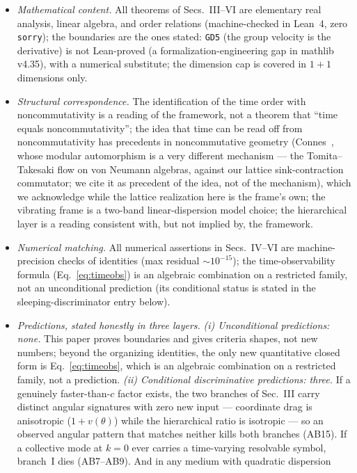 \documentclass[aps,prd,preprint,superscriptaddress,amsmath,amssymb]{revtex4-2}
\begin{document}
\begin{itemize}
\item \emph{Mathematical content.}  All theorems of Secs.~III--VI are
elementary real analysis, linear algebra, and order relations
(machine-checked in Lean~4, zero \texttt{sorry}); the boundaries are
the ones stated: \texttt{GD5} (the group velocity is the derivative)
is not Lean-proved (a formalization-engineering gap in mathlib
v4.35), with a numerical substitute; the dimension cap is covered in
$1+1$ dimensions only.
\item \emph{Structural correspondence.}  The identification of the
time order with noncommutativity is a reading of the framework, not a
theorem that ``time equals noncommutativity''; the idea that time
can be read off from noncommutativity has precedents in
noncommutative geometry (Connes~\cite{connes1994ncg}, whose modular
automorphism is a very different mechanism --- the Tomita--Takesaki
flow on von Neumann algebras, against our lattice sink-contraction
commutator; we cite it as precedent of the idea, not of the
mechanism), which we
acknowledge while the lattice realization here is the frame's own;
the vibrating frame is
a two-band linear-dispersion model choice; the hierarchical layer is
a reading consistent with, but not implied by, the framework.
\item \emph{Numerical matching.}  All numerical assertions in
Secs.~IV--VI are machine-precision checks of identities
(max residual $\sim 10^{-15}$); the time-observability formula
(Eq.~\ref{eq:timeobs}) is an algebraic combination on a restricted
family, not an unconditional prediction (its conditional status is
stated in the sleeping-discriminator entry below).
\item \emph{Predictions, stated honestly in three layers.}
\emph{(i) Unconditional predictions: none.}  This paper proves
boundaries and gives criteria shapes, not new numbers; beyond the
organizing identities, the only new quantitative closed form is
Eq.~\ref{eq:timeobs}, which is an
algebraic combination on a restricted family, not a prediction.
\emph{(ii) Conditional discriminative predictions: three.}  If a
genuinely faster-than-$c$ factor exists, the two branches of
Sec.~III carry distinct angular signatures with zero new input ---
coordinate drag is anisotropic ($1+v(\theta)$) while the hierarchical
ratio is isotropic --- so an observed angular pattern that matches
neither kills both branches (AB15).  If a collective mode at
$k=0$ ever carries a time-varying resolvable symbol, branch~I dies
(AB7--AB9).  And in any medium with quadratic dispersion

\end{itemize}
\end{document}
